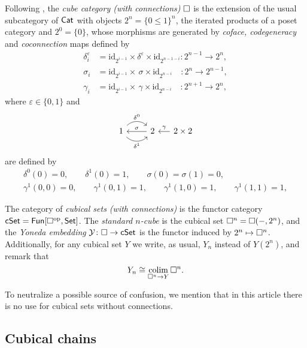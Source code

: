 Following \cite{brown1981cubes}, the \textit{cube category (with connections)} $\square$ is the extension of the usual subcategory of $\mathsf{Cat}$ with objects $2^n = \{0 \leq 1\}^n$, the iterated products of a poset category and $2^0 = \{0\}$, whose morphisms are generated by \textit{coface, codegeneracy} and \textit{coconnection} maps defined by
\begin{align*}
\delta_i^\varepsilon & =
\mathrm{id}_{2^{i-1}} \times \delta^\varepsilon \times \mathrm{id}_{2^{n-1-i}} \colon 2^{n-1} \to 2^n, \\
\sigma_i & =
\mathrm{id}_{2^{i-1}} \times \, \sigma \times \mathrm{id}_{2^{n-i}} \quad \colon 2^{n} \to 2^{n-1}, \\
\gamma_i & =
\mathrm{id}_{2^{i-1}} \times \, \gamma \times \mathrm{id}_{2^{n-i}} \quad \colon 2^{n+1} \to 2^{n},
\end{align*}
where $\varepsilon \in \{0,1\}$ and
\[
\begin{tikzcd}
1 \arrow[r, out=45, in=135, "\delta^0"] \arrow[r, out=-45, in=-135, "\delta^1"'] & 2 \arrow[l, "\sigma"'] &[-10pt] \arrow[l, "\gamma"'] 2 \times 2
\end{tikzcd}
\]
are defined by
\begin{gather*}
\delta^0(0) = 0, \qquad
\delta^1(0) = 1, \qquad
\sigma(0) = \sigma(1) = 0, \qquad \\
\gamma^1(0,0) = 0, \qquad
\gamma^1(0,1) = 1, \qquad
\gamma^1(1,0) = 1, \qquad
\gamma^1(1,1) = 1, 
\end{gather*}

The category of \textit{cubical sets (with connections)} is the functor category $\mathsf{cSet} = \mathsf{Fun}[\square^{\mathrm{op}}, \mathsf{Set}]$.
The \textit{standard $n$-cube} is the cubical set $\square^n = \square(-, 2^n)$, and the \textit{Yoneda embedding} $\operatorname{\mathcal{Y}} \colon \square \to \mathsf{cSet}$ is the functor induced by $2^n \mapsto \square^n$.
Additionally, for any cubical set $Y$ we write, as usual, $Y_n$ instead of $Y(2^n)$, and remark that
\[
Y_n \cong \operatorname*{colim}_{\square^n \to Y} \square^n.
\]

To neutralize a possible source of confusion, we mention that in this article there is no use for cubical sets without connections.

\subsection{Cubical chains}

